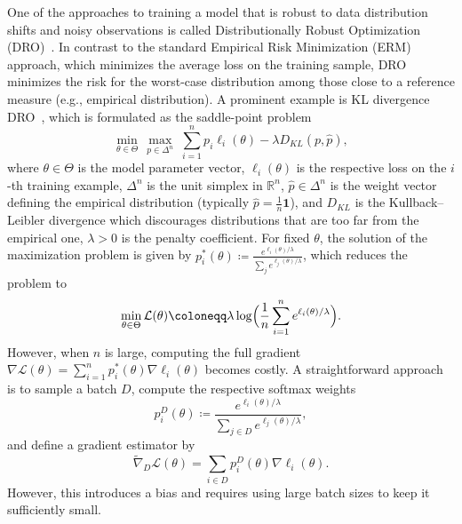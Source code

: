 \documentclass{article}
\newcommand{\R}{\mathbb{R}}
\newcommand*{\eqset}{\coloneqq}
\theoremstyle{plain}
\theoremstyle{definition}
\theoremstyle{remark}
\begin{document}
One of the approaches to training a model that is robust to data distribution shifts and noisy observations
is called Distributionally Robust Optimization (DRO)~\citep{kuhnDistributionallyRobustOptimization2024}.  
In contrast to the standard Empirical Risk Minimization (ERM) approach, which minimizes the average loss on the training sample, DRO minimizes the risk for the worst-case distribution among those close to a reference measure (e.g., empirical distribution). A prominent example is KL divergence DRO~\citep{huKullbackLeiblerDivergenceConstrained}, which is formulated as the saddle-point problem
\begin{equation}\label{eq:kldro_sth}
    \min_{\theta \in \Theta}\, \max_{p \in \Delta^n}\; \sum_{i=1}^n p_i \ell_i(\theta) - \lambda D_{KL}(p, \hat{p}),
\end{equation}
where $\theta \in \Theta$ is the model parameter vector, $\ell_i(\theta)$ is the respective loss on the $i$-th training example, $\Delta^n$ is the unit simplex in $\R^n$, $\hat{p} \in \Delta^n$ is the weight vector defining the empirical distribution (typically $\hat{p} = \frac{1}{n}\mathbf{1}$), and $D_{KL}$ is the Kullback--Leibler divergence
which discourages distributions that are too far from the empirical one,
$\lambda>0$ is the penalty coefficient.  
For fixed $\theta$, the solution of the maximization problem is given by  
$p_i^*(\theta) \eqset \frac{e^{\ell_i(\theta) / \lambda}}{\sum_j e^{\ell_j(\theta) / \lambda}}$,  
which reduces the problem to
\begin{equation}\label{eq:kl_dro_relaxed}
    \min_{\theta \in \Theta} \mathcal{L}(\theta) \eqset \lambda \log \Bigl( \frac{1}{n} \sum_{i=1}^n e^{\ell_i(\theta) / \lambda} \Bigr) .
\end{equation}
However, when $n$ is large, computing the full gradient $\nabla \mathcal{L}(\theta) = \sum_{i=1}^n p_i^*(\theta) \nabla \ell_i(\theta)$ becomes costly.
A straightforward approach \citep{levy2020large} is to sample a batch $D$, compute the respective softmax weights
\[
p_i^D(\theta) \eqset \frac{e^{\ell_i(\theta) / \lambda}}{\sum_{j\in D} e^{\ell_j(\theta) / \lambda}},
\]
and define a gradient estimator by
\begin{equation}\label{eq:batch_grad}
    \tilde{\nabla}_D \mathcal{L}(\theta) = \sum_{i\in D} p_i^D(\theta) \nabla \ell_i(\theta).
\end{equation}
However, this introduces a bias and requires using large batch sizes to keep it sufficiently small.
\end{document}

